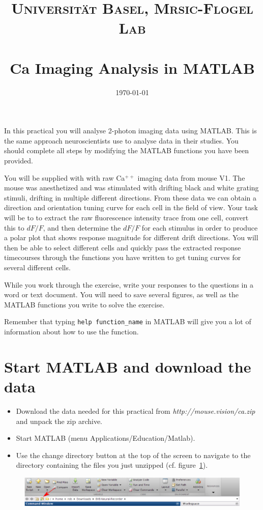 \documentclass[paper=a4, fontsize=11pt]{scrartcl} %
\title{%
\normalfont \normalsize 
\textsc{Universit\"{a}t Basel, Mrsic-Flogel Lab} \\ [25pt] %
\horrule{0.5pt} \\[0.2cm] %
\huge Ca\supr{++} Imaging Analysis in MATLAB
\horrule{1.5pt}\\ %
}
\author{}
\date{\normalsize\today} %
\numberwithin{equation}{section} %
\numberwithin{figure}{section} %
\numberwithin{table}{section} %
\newcommand{\supr}[1]{\ensuremath{^{#1}}}
\begin{document}
\maketitle %

In this practical you will analyse 2-photon imaging data using MATLAB. This is the same approach 
neuroscientists use to analyse data in their studies. You should complete all steps by modifying the 
MATLAB functions you have been provided.

You will be supplied with with raw Ca\supr{++} imaging data from mouse V1. The mouse 
was anesthetized and was stimulated with drifting black and white grating stimuli, drifting in multiple different directions. From these data
we can obtain a direction and orientation tuning curve for each cell in the field of view. Your task will be to to 
extract the raw fluorescence intensity trace from one cell, convert this to $dF/F$, and then 
determine the $dF/F$ for each stimulus in order to produce a polar plot that shows response magnitude
for different drift directions. You will then be able to select different cells and quickly pass the extracted 
response timecourses through the functions you have written to get tuning curves for several 
different cells. 

While you work through the exercise, write your responses to the questions in a word or text document. You will need to save several figures, as well as the MATLAB functions you write to solve the exercise.

Remember that typing \texttt{help function\_name} in MATLAB will give you a lot of information about how to use the function.


\section{Start MATLAB and download the data}
\begin{itemize}
\setlength{\parskip}{0.25em}
\item Download the data needed for this practical from \textit{http://mouse.vision/ca.zip} and unpack the zip archive.
\item Start MATLAB (menu Applications/Education/Matlab).
\item Use the change directory button at the top of the screen to navigate to the 
  directory containing the files you just unzipped (cf. figure~\ref{fig:toolbar}). 
\end{itemize}

\begin{figure}
    \centering
    \includegraphics[width=\textwidth]{change_dir.eps}
    \caption{}
    \label{fig:toolbar}
\end{figure}
\end{document}
